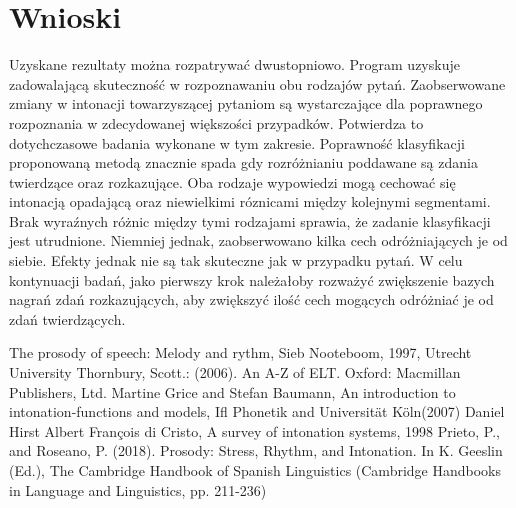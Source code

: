 \documentclass[a4paper,12 pt]{article}
\begin{document}
\section{Wnioski}
Uzyskane rezultaty można rozpatrywać dwustopniowo. Program uzyskuje zadowalającą skuteczność w rozpoznawaniu obu rodzajów pytań. Zaobserwowane zmiany w intonacji towarzyszącej pytaniom są wystarczające dla poprawnego rozpoznania w zdecydowanej większości przypadków. Potwierdza to dotychczasowe badania wykonane w tym zakresie. 
\newline
\newline Poprawność klasyfikacji proponowaną metodą znacznie spada gdy rozróżnianiu poddawane są zdania twierdzące oraz rozkazujące. Oba rodzaje wypowiedzi mogą cechować się intonacją opadającą oraz niewielkimi róznicami między kolejnymi segmentami. Brak wyraźnych różnic między tymi rodzajami sprawia, że zadanie klasyfikacji jest utrudnione. Niemniej jednak, zaobserwowano kilka cech odróżniających je od siebie. Efekty jednak nie są tak skuteczne jak w przypadku pytań.
\newline
\newline
W celu kontynuacji badań, jako pierwszy krok należałoby rozważyć zwiększenie bazych nagrań zdań rozkazujących, aby zwiększyć ilość cech mogących odróżniać je od zdań twierdzących.
\newpage
\begin{thebibliography}{99}
The prosody of speech: Melody and rythm, Sieb Nooteboom, 1997, Utrecht University
Thornbury, Scott.:
 (2006). An A-Z of ELT. Oxford: Macmillan Publishers, Ltd.
Martine Grice and Stefan Baumann, An introduction to intonation-functions and models, Ifl Phonetik and Universität Köln(2007)
Daniel Hirst Albert François di Cristo, A survey of intonation systems, 1998
Prieto, P., and Roseano, P. (2018). Prosody: Stress, Rhythm, and Intonation. In K. Geeslin (Ed.), The Cambridge Handbook of Spanish Linguistics (Cambridge Handbooks in Language and Linguistics, pp. 211-236)



\end{thebibliography}
\end{document}
